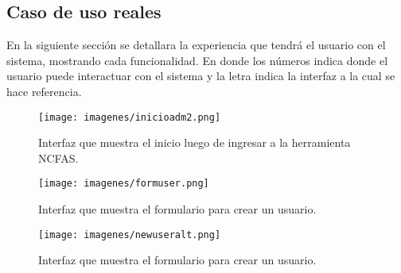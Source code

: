 \subsection{Caso de uso reales}

En la siguiente sección se detallara la experiencia que tendrá el usuario con el sistema, mostrando cada funcionalidad. En donde los números indica donde el usuario puede interactuar con el sistema y la letra indica la interfaz a la cual se hace referencia.\\

\begin{figure}[htb]
	\label{inicioadm2}
	\begin{center}
		\texttt{[image: imagenes/inicioadm2.png]}
	\end{center}
	\caption{Interfaz que muestra el inicio luego de ingresar a la herramienta NCFAS.}
\end{figure}

\begin{figure}[htb]
	\label{formuser}
	\begin{center}
		\texttt{[image: imagenes/formuser.png]}
	\end{center}
	\caption{Interfaz que muestra el formulario para crear un usuario.}
\end{figure}

\begin{figure}[htb]
	\label{newuseralt}
	\begin{center}
		\texttt{[image: imagenes/newuseralt.png]}
	\end{center}
	\caption{Interfaz que muestra el formulario para crear un usuario.}
\end{figure}

